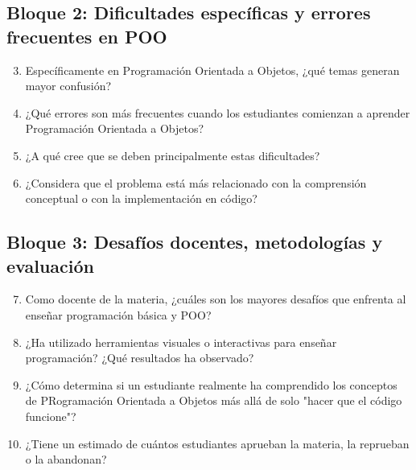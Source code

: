 \subsection*{Bloque 2: Dificultades específicas y errores frecuentes en POO}
\begin{enumerate}
    \setcounter{enumi}{2}
    \item 
        Específicamente en Programación Orientada a Objetos, ¿qué temas generan 
        mayor confusión?
    \item 
        ¿Qué errores son más frecuentes cuando los estudiantes comienzan a 
        aprender Programación Orientada a Objetos?
    \item 
        ¿A qué cree que se deben principalmente estas dificultades?
    \item 
        ¿Considera que el problema está más relacionado con la comprensión 
        conceptual o con la implementación en código?
\end{enumerate}

\subsection*{Bloque 3: Desafíos docentes, metodologías y evaluación}
\begin{enumerate}
    \setcounter{enumi}{6}
    \item 
        Como docente de la materia, ¿cuáles son los mayores desafíos que 
        enfrenta al enseñar programación básica y POO?
    \item 
        ¿Ha utilizado herramientas visuales o interactivas para enseñar 
        programación? ¿Qué resultados ha observado?
    \item   
        ¿Cómo determina si un estudiante realmente ha comprendido los conceptos 
        de PRogramación Orientada a Objetos más allá de solo 
        "hacer que el código funcione"?
    \item 
        ¿Tiene un estimado de cuántos estudiantes aprueban la materia, la 
        reprueban o la abandonan?
\end{enumerate}



